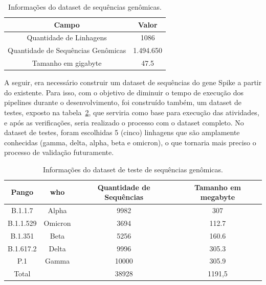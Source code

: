 \begin{table}[htb]
  \caption{Informações do dataset de sequências genômicas.}
  \begin{center}
    \begin{tabular}{c|c}
      \hline
      Campo                              & Valor     \\
      \hline
      Quantidade de Linhagens            & 1086      \\
      Quantidade de Sequências Genômicas & 1.494.650 \\
      Tamanho em \gls{gigabyte}          & 47.5      \\
      \hline
    \end{tabular}
  \end{center}
  \label{tab:datasetGenomas}
\end{table}

A seguir, era necessário construir um dataset de sequências do gene Spike a partir do existente. Para isso, com o objetivo de diminuir o tempo de execução dos pipelines durante o desenvolvimento, foi construído também, um dataset de testes, exposto na tabela~\ref{tab:datasetGenomasTeste}, que serviria como base para execução das atividades, e após as verificações, seria realizado o processo com o dataset completo. No dataset de testes, foram escolhidas 5 (cinco) linhagens que são amplamente conhecidas (gamma, delta, alpha, beta e omicron), o que tornaria mais preciso o processo de validação futuramente.

\begin{table}[htb]
  \caption{Informações do dataset de teste de sequências genômicas.}
  \begin{center}
    \begin{tabular}{c|c|c|c}
      \hline
      Pango     & \gls{who} & Quantidade de Sequências & Tamanho em \gls{megabyte} \\
      \hline
      B.1.1.7   & Alpha     & 9982                     & 307                       \\
      B.1.1.529 & Omicron   & 3694                     & 112.7                     \\
      B.1.351   & Beta      & 5256                     & 160.6                     \\
      B.1.617.2 & Delta     & 9996                     & 305.3                     \\
      P.1       & Gamma     & 10000                    & 305.9                     \\
      \hline
      Total     &           & 38928                    & 1191,5                    \\
      \hline
    \end{tabular}
  \end{center}
  \label{tab:datasetGenomasTeste}
\end{table}

